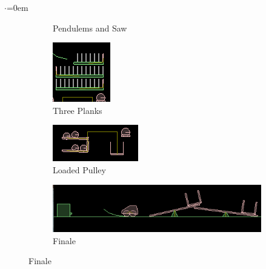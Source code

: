 \documentclass{report}
\begin{document}
\begin{list}{$\cdot$}{\leftmargin=0em}
\begin{figure}
\begin{subfigure}[h]{0.3\textwidth}
\caption{Pendulems and Saw}
\end{subfigure}
\begin{subfigure}[h]{0.3\textwidth}
\includegraphics[width=\textwidth, height=0.5\textwidth]{latex/box2d_3.png}
\caption{Three Planks}
\end{subfigure}
\centering
\begin{subfigure}[h]{0.3\textwidth}
\includegraphics[width=\textwidth, height=0.5\textwidth]{latex/box2d_4.png}
\caption{Loaded Pulley}
\end{subfigure}
\begin{subfigure}[h]{0.3\textwidth}
\includegraphics[width=\textwidth, height=0.5\textwidth]{latex/box2d_5.png}
\caption{Finale}
\end{subfigure}
\end{figure}

\end{list}
\pagebreak
\end{document}
